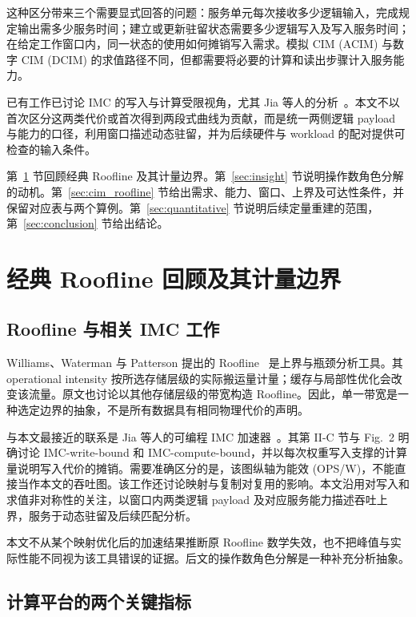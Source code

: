 \documentclass[11pt, a4paper]{ctexart}
\theoremstyle{definition}
\begin{document}
这种区分带来三个需要显式回答的问题：服务单元每次接收多少逻辑输入，完成规定输出需多少服务时间；建立或更新驻留状态需要多少逻辑写入及写入服务时间；在给定工作窗口内，同一状态的使用如何摊销写入需求。模拟 CIM (ACIM) 与数字 CIM (DCIM) 的求值路径不同，但都需要将必要的计算和读出步骤计入服务能力。

已有工作已讨论 IMC 的写入与计算受限视角，尤其 Jia 等人的分析~\cite{jia2022imc_accelerator}。本文不以首次区分这两类代价或首次得到两段式曲线为贡献，而是统一两侧逻辑 payload 与能力的口径，利用窗口描述动态驻留，并为后续硬件与 workload 的配对提供可检查的输入条件。

第~\ref{sec:background} 节回顾经典 Roofline 及其计量边界。第~\ref{sec:insight} 节说明操作数角色分解的动机。第~\ref{sec:cim_roofline} 节给出需求、能力、窗口、上界及可达性条件，并保留对应表与两个算例。第~\ref{sec:quantitative} 节说明后续定量重建的范围，第~\ref{sec:conclusion} 节给出结论。
\newpage

\section{经典 Roofline 回顾及其计量边界}
\label{sec:background}

\subsection{Roofline 与相关 IMC 工作}
\label{sec:roofline_review}

Williams、Waterman 与 Patterson 提出的 Roofline~\cite{williams2009roofline} 是上界与瓶颈分析工具。其 operational intensity 按所选存储层级的实际搬运量计量；缓存与局部性优化会改变该流量。原文也讨论以其他存储层级的带宽构造 Roofline。因此，单一带宽是一种选定边界的抽象，不是所有数据具有相同物理代价的声明。

与本文最接近的联系是 Jia 等人的可编程 IMC 加速器~\cite{jia2022imc_accelerator}。其第 II-C 节与 Fig.~2 明确讨论 IMC-write-bound 和 IMC-compute-bound，并以每次权重写入支撑的计算量说明写入代价的摊销。需要准确区分的是，该图纵轴为能效 (OPS/W)，不能直接当作本文的吞吐图。该工作还讨论映射与复制对复用的影响。本文沿用对写入和求值非对称性的关注，以窗口内两类逻辑 payload 及对应服务能力描述吞吐上界，服务于动态驻留及后续匹配分析。

本文不从某个映射优化后的加速结果推断原 Roofline 数学失效，也不把峰值与实际性能不同视为该工具错误的证据。后文的操作数角色分解是一种补充分析抽象。

\subsection{计算平台的两个关键指标}
\label{sec:gpu_hw}
\end{document}

